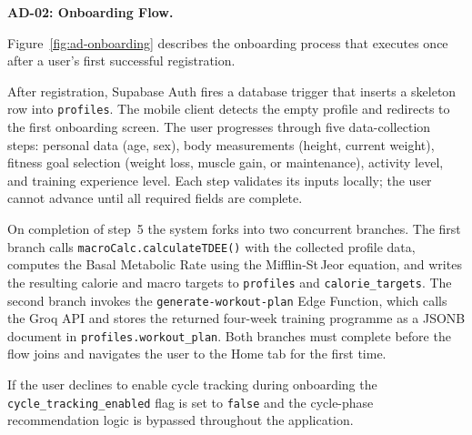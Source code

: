 \textbf{AD-02: Onboarding Flow.}

Figure~\ref{fig:ad-onboarding} describes the onboarding process that
executes once after a user's first successful registration.

After registration, Supabase Auth fires a database trigger that
inserts a skeleton row into \texttt{profiles}. The mobile client
detects the empty profile and redirects to the first onboarding
screen. The user progresses through five data-collection steps:
personal data (age, sex), body measurements (height, current weight), fitness goal selection (weight loss, muscle gain, or maintenance), activity level, and training experience level. Each step validates its inputs locally; the user cannot advance until all required fields are complete.

On completion of step~5 the system forks into two concurrent
branches. The first branch calls \texttt{macroCalc.calculateTDEE()}
with the collected profile data, computes the Basal Metabolic Rate using the Mifflin-St\,Jeor equation, and writes the resulting calorie and macro targets to \texttt{profiles} and \texttt{calorie\_targets}.
The second branch invokes the \texttt{generate-workout-plan} Edge Function, which calls the Groq API and stores the returned four-week training programme as a JSONB document in \texttt{profiles.workout\_plan}. Both branches must complete before the flow joins and navigates the user to the Home tab for the first time.

If the user declines to enable cycle tracking during onboarding the \texttt{cycle\_tracking\_enabled} flag is set to \texttt{false} and the cycle-phase recommendation logic is bypassed throughout the application.

